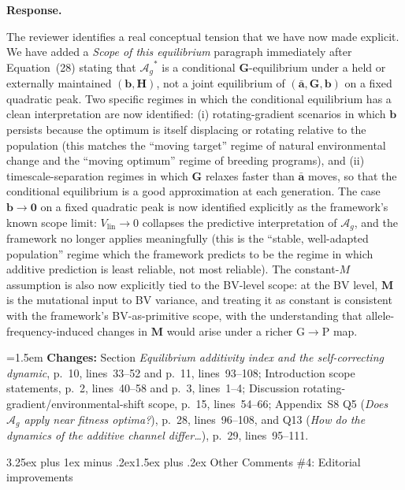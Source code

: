 \documentclass[11pt,a4paper]{article}
\makeatletter
\newcommand{\response}{%
  \par\medskip\noindent\textbf{\color{ResponseColor}Response.}\quad\ignorespaces
}
\newcommand{\changesat}[1]{%
  \par\smallskip\noindent\hangindent=1.5em\hangafter=1
  \textbf{\color{ChangeColor}Changes:} \quad #1\par\medskip
}
\renewcommand{\subsection}{\@startsection{subsection}{2}{0pt}%
  {3.25ex plus 1ex minus .2ex}{1.5ex plus .2ex}%
  {\large\bfseries}}
\newcommand{\Ag}{\ensuremath{\mathcal{A}_{g}}\xspace}
\newcommand{\Vlin}{\ensuremath{V_{\mathrm{lin}}}\xspace}
\newcommand{\mat}[1]{\ensuremath{\mathbf{#1}}}
\newcommand{\vect}[1]{\ensuremath{\bm{#1}}}
\makeatother
\begin{document}
\response
The reviewer identifies a real conceptual tension that we have now made explicit. We have added a \textit{Scope of this equilibrium} paragraph immediately after Equation~(28) stating that $\Ag^*$ is a conditional $\mat{G}$-equilibrium under a held or externally maintained $(\vect{b}, \mat{H})$, not a joint equilibrium of $(\bar{\vect{a}}, \mat{G}, \vect{b})$ on a fixed quadratic peak. Two specific regimes in which the conditional equilibrium has a clean interpretation are now identified: (i) rotating-gradient scenarios in which $\vect{b}$ persists because the optimum is itself displacing or rotating relative to the population (this matches the ``moving target'' regime of natural environmental change and the ``moving optimum'' regime of breeding programs), and (ii) timescale-separation regimes in which $\mat{G}$ relaxes faster than $\bar{\vect{a}}$ moves, so that the conditional equilibrium is a good approximation at each generation. The case $\vect{b} \to \vect{0}$ on a fixed quadratic peak is now identified explicitly as the framework's known scope limit: $\Vlin \to 0$ collapses the predictive interpretation of $\Ag$, and the framework no longer applies meaningfully (this is the ``stable, well-adapted population'' regime which the framework predicts to be the regime in which additive prediction is least reliable, not most reliable). The constant-$M$ assumption is also now explicitly tied to the BV-level scope: at the BV level, $\mat{M}$ is the mutational input to BV variance, and treating it as constant is consistent with the framework's BV-as-primitive scope, with the understanding that allele-frequency-induced changes in $\mat{M}$ would arise under a richer G$\to$P map.

\changesat{Section \textit{Equilibrium additivity index and the self-correcting dynamic}, p.~10, lines~33--52 and p.~11, lines~93--108; Introduction scope statements, p.~2, lines~40--58 and p.~3, lines~1--4; Discussion rotating-gradient/environmental-shift scope, p.~15, lines~54--66; Appendix~S8 Q5 (\textit{Does $\Ag$ apply near fitness optima?}), p.~28, lines~96--108, and Q13 (\textit{How do the dynamics of the additive channel differ\ldots}), p.~29, lines~95--111.}

\subsection{Other Comments \#4: Editorial improvements}
\end{document}
